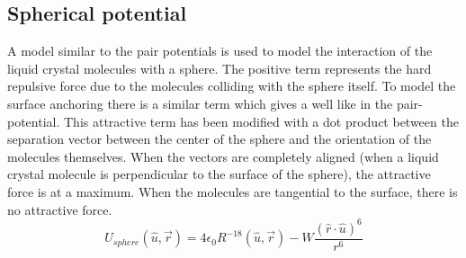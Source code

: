 \documentclass[preprint, aps]{revtex4-1}
\begin{document}
\subsection*{Spherical potential}
A model similar to the pair potentials is used to model the interaction of the
liquid crystal molecules with a sphere. The positive term represents the hard
repulsive force due to the molecules colliding with the sphere itself. To model
the surface anchoring there is a similar term which gives a well like in the
pair-potential. This attractive term has been modified with a dot product
between the separation vector between the center of the sphere and the
orientation of the molecules themselves. When the vectors are completely
aligned (when a liquid crystal molecule is perpendicular to the surface of the
sphere), the attractive force is at a maximum. When the molecules are tangential
to the surface, there is no attractive force.
	\begin{equation} \label{sphere-pot}
		U_{sphere} (\hat{u}, \vec{r}) 
		= 4\epsilon_0 R^{-18}(\hat{u}, \vec{r}) 
		- W\frac{
			(\hat{r}\cdot\hat{u})^6
			}
			{
			r^6
			}
	\end{equation}
\end{document}

